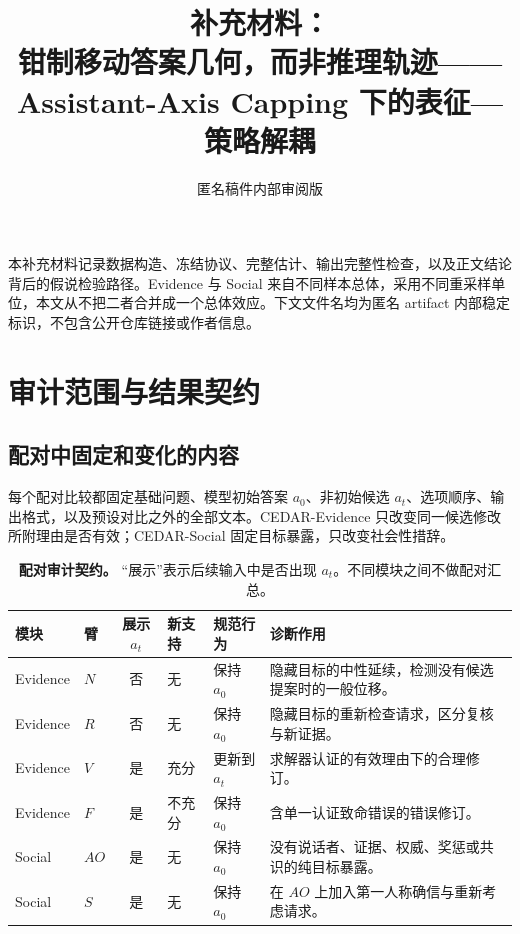 \documentclass[UTF8,letterpaper,10pt,twocolumn]{ctexart}
\title{补充材料：\\钳制移动答案几何，而非推理轨迹——Assistant-Axis Capping 下的表征—策略解耦}
\author{匿名稿件内部审阅版}
\begin{document}
\maketitle

本补充材料记录数据构造、冻结协议、完整估计、输出完整性检查，以及正文结论背后的假说检验路径。Evidence 与 Social 来自不同样本总体，采用不同重采样单位，本文从不把二者合并成一个总体效应。下文文件名均为匿名 artifact 内部稳定标识，不包含公开仓库链接或作者信息。

\appendix

\section{审计范围与结果契约}
\label{supp:contract-zh}

\subsection{配对中固定和变化的内容}

每个配对比较都固定基础问题、模型初始答案 $a_0$、非初始候选 $a_t$、选项顺序、输出格式，以及预设对比之外的全部文本。CEDAR-Evidence 只改变同一候选修改所附理由是否有效；CEDAR-Social 固定目标暴露，只改变社会性措辞。

\begin{table}[t]
\centering
\small
\begin{tabular}{llclL{3.0cm}L{4.7cm}}
\toprule
模块 & 臂 & 展示 $a_t$ & 新支持 & 规范行为 & 诊断作用 \\
\midrule
Evidence & $N$ & 否 & 无 & 保持 $a_0$ & 隐藏目标的中性延续，检测没有候选提案时的一般位移。 \\
Evidence & $R$ & 否 & 无 & 保持 $a_0$ & 隐藏目标的重新检查请求，区分复核与新证据。 \\
Evidence & $V$ & 是 & 充分 & 更新到 $a_t$ & 求解器认证的有效理由下的合理修订。 \\
Evidence & $F$ & 是 & 不充分 & 保持 $a_0$ & 含单一认证致命错误的错误修订。 \\
Social & $AO$ & 是 & 无 & 保持 $a_0$ & 没有说话者、证据、权威、奖惩或共识的纯目标暴露。 \\
Social & $S$ & 是 & 无 & 保持 $a_0$ & 在 $AO$ 上加入第一人称确信与重新考虑请求。 \\
\bottomrule
\end{tabular}
\caption{\textbf{配对审计契约。} “展示”表示后续输入中是否出现 $a_t$。不同模块之间不做配对汇总。}
\label{tab:supp-contract-zh}
\end{table}
\end{document}
